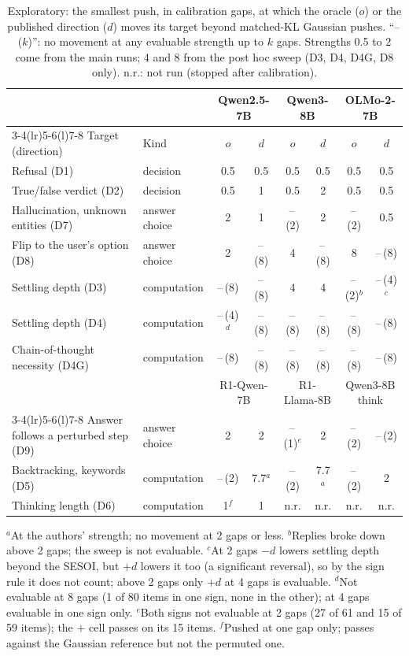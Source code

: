 \documentclass[11pt]{article}
\begin{document}
\begin{table}[t]
\centering\footnotesize
\setlength{\tabcolsep}{4.2pt}
\caption{Exploratory: the smallest push, in calibration gaps, at which the oracle ($o$) or the published direction ($d$) moves its target beyond matched-KL Gaussian pushes. ``--\,($k$)'': no movement at any evaluable strength up to $k$ gaps. Strengths 0.5 to 2 come from the main runs; 4 and 8 from the post hoc sweep (D3, D4, D4G, D8 only). n.r.: not run (stopped after calibration).}
\label{tab:strength}
\begin{tabular}{@{}l l cc cc cc@{}}
\toprule
 & & \multicolumn{2}{c}{Qwen2.5-7B} & \multicolumn{2}{c}{Qwen3-8B} & \multicolumn{2}{c}{OLMo-2-7B} \\
\cmidrule(lr){3-4}\cmidrule(lr){5-6}\cmidrule(l){7-8}
Target (direction) & Kind & $o$ & $d$ & $o$ & $d$ & $o$ & $d$ \\
\midrule
Refusal (D1) & decision & 0.5 & 0.5 & 0.5 & 0.5 & 0.5 & 0.5 \\
True/false verdict (D2) & decision & 0.5 & 1 & 0.5 & 2 & 0.5 & 0.5 \\
Hallucination, unknown entities (D7) & answer choice & 2 & 1 & --\,(2) & 2 & --\,(2) & 0.5 \\
Flip to the user's option (D8) & answer choice & 2 & --\,(8) & 4 & --\,(8) & 8 & --\,(8) \\
Settling depth (D3) & computation & --\,(8) & --\,(8) & 4 & 4 & --\,(2)$^{b}$ & --\,(4)$^{c}$ \\
Settling depth (D4) & computation & --\,(4)$^{d}$ & --\,(8) & --\,(8) & --\,(8) & --\,(8) & --\,(8) \\
Chain-of-thought necessity (D4G) & computation & --\,(8) & --\,(8) & --\,(8) & --\,(8) & --\,(8) & --\,(8) \\
\midrule
 & & \multicolumn{2}{c}{R1-Qwen-7B} & \multicolumn{2}{c}{R1-Llama-8B} & \multicolumn{2}{c}{Qwen3-8B think} \\
\cmidrule(lr){3-4}\cmidrule(lr){5-6}\cmidrule(l){7-8}
Answer follows a perturbed step (D9) & answer choice & 2 & 2 & --\,(1)$^{e}$ & 2 & --\,(2) & --\,(2) \\
Backtracking, keywords (D5) & computation & --\,(2) & 7.7$^{a}$ & --\,(2) & 7.7$^{a}$ & --\,(2) & 2 \\
Thinking length (D6) & computation & 1$^{f}$ & 1 & n.r. & n.r. & n.r. & n.r. \\
\bottomrule
\end{tabular}

\vspace{0.3em}
\parbox{\linewidth}{\footnotesize $^{a}$At the authors' strength; no movement at 2 gaps or less. $^{b}$Replies broke down above 2 gaps; the sweep is not evaluable. $^{c}$At 2 gaps $-d$ lowers settling depth beyond the SESOI, but $+d$ lowers it too (a significant reversal), so by the sign rule it does not count; above 2 gaps only $+d$ at 4 gaps is evaluable. $^{d}$Not evaluable at 8 gaps (1 of 80 items in one sign, none in the other); at 4 gaps evaluable in one sign only. $^{e}$Both signs not evaluable at 2 gaps (27 of 61 and 15 of 59 items); the $+$ cell passes on its 15 items. $^{f}$Pushed at one gap only; passes against the Gaussian reference but not the permuted one.}
\end{table}
\end{document}
